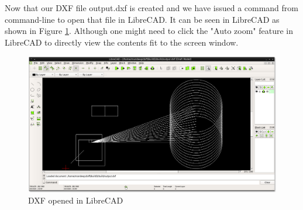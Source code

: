Now that our DXF file output.dxf is created and we have issued a command from command-line to open that file in LibreCAD. It can be seen in LibreCAD as shown in Figure \ref{fig:lc}. Although one might need to click the "Auto zoom" feature in LibreCAD to directly view the contents fit to the screen window.

\begin{figure}
\centering
\includegraphics[scale=0.38]{images/bld5.png}
\caption{DXF opened in LibreCAD}
\label{fig:lc}
\end{figure}